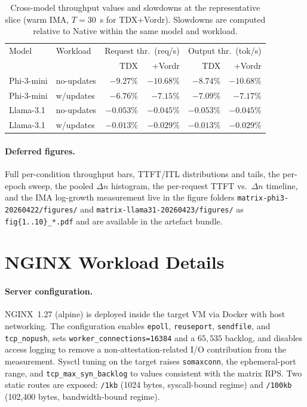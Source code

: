 \begin{table}[t]
\centering
\small
\caption{Cross-model throughput values and slowdowns at the
representative slice (warm IMA, $T{=}30$~s for TDX+Vordr). Slowdowns
are computed relative to Native within the same model and workload.}
\label{tab:llm-throughput}
\begin{tabular}{@{}llrrrr@{}}
\toprule
Model & Workload &
\multicolumn{2}{c}{Request thr.\ (req/s)} &
\multicolumn{2}{c}{Output thr.\ (tok/s)} \\
& & TDX & +Vordr & TDX & +Vordr \\
\midrule
Phi-3-mini & no-updates    & $-9.27\%$ & $-10.68\%$ & $-8.74\%$ & $-10.68\%$ \\
Phi-3-mini & w/updates & $-6.76\%$ & $-7.15\%$  & $-7.09\%$ & $-7.17\%$  \\
Llama-3.1  & no-updates    & $-0.053\%$& $-0.045\%$ & $-0.053\%$& $-0.045\%$ \\
Llama-3.1  & w/updates & $-0.013\%$& $-0.029\%$ & $-0.013\%$& $-0.029\%$ \\
\bottomrule
\end{tabular}
\end{table}

\paragraph{Deferred figures.}
Full per-condition throughput bars, TTFT/ITL distributions and tails,
the per-epoch sweep, the pooled $\Delta n$ histogram, the per-request
TTFT vs.\ $\Delta n$ timeline, and the IMA log-growth measurement live
in the figure folders \texttt{matrix-phi3-20260422/figures/} and
\texttt{matrix-llama31-20260423/figures/} as
\texttt{fig\{1..10\}\_*.pdf} and are available in the artefact bundle.

\section{NGINX Workload Details}
\label{app:nginx-detail}

\paragraph{Server configuration.}
NGINX~1.27 (alpine) is deployed inside the target VM via Docker with
host networking. The configuration enables \texttt{epoll},
\texttt{reuseport}, \texttt{sendfile}, and \texttt{tcp\_nopush}, sets
\texttt{worker\_connections=16384} and a $65{,}535$ backlog, and
disables access logging to remove a non-attestation-related I/O
contribution from the measurement. Sysctl tuning on the target raises
\texttt{somaxconn}, the ephemeral-port range, and
\texttt{tcp\_max\_syn\_backlog} to values consistent with the matrix
RPS. Two static routes are exposed: \texttt{/1kb} (1024 bytes,
syscall-bound regime) and \texttt{/100kb} (102{,}400 bytes,
bandwidth-bound regime).

